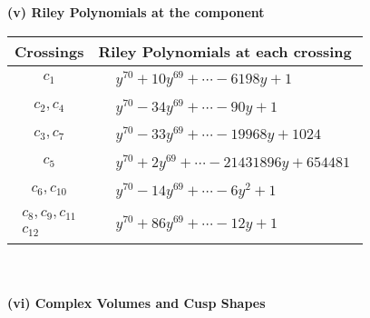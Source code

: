 \documentclass[1p]{elsarticle_modified}
\theoremstyle{definition}
\begin{document}
\newpage\renewcommand{\arraystretch}{1}
\flushleft \textbf{(v) Riley Polynomials at the component}\newline \\
\begin{tabular}{m{50pt}|m{274pt}}
Crossings & \hspace{64pt}Riley Polynomials at each crossing \\
\hline $$\begin{aligned}c_{1}\end{aligned}$$&$\begin{aligned}
&y^{70}+10 y^{69}+\cdots-6198 y+1
\end{aligned}$\\
\hline $$\begin{aligned}c_{2},c_{4}\end{aligned}$$&$\begin{aligned}
&y^{70}-34 y^{69}+\cdots-90 y+1
\end{aligned}$\\
\hline $$\begin{aligned}c_{3},c_{7}\end{aligned}$$&$\begin{aligned}
&y^{70}-33 y^{69}+\cdots-19968 y+1024
\end{aligned}$\\
\hline $$\begin{aligned}c_{5}\end{aligned}$$&$\begin{aligned}
&y^{70}+2 y^{69}+\cdots-21431896 y+654481
\end{aligned}$\\
\hline $$\begin{aligned}c_{6},c_{10}\end{aligned}$$&$\begin{aligned}
&y^{70}-14 y^{69}+\cdots-6 y^2+1
\end{aligned}$\\
\hline $$\begin{aligned}c_{8},c_{9},c_{11}\\c_{12}\end{aligned}$$&$\begin{aligned}
&y^{70}+86 y^{69}+\cdots-12 y+1
\end{aligned}$\\
\hline
\end{tabular}\\~\\
\newpage\flushleft \textbf{(vi) Complex Volumes and Cusp Shapes}
\end{document}
